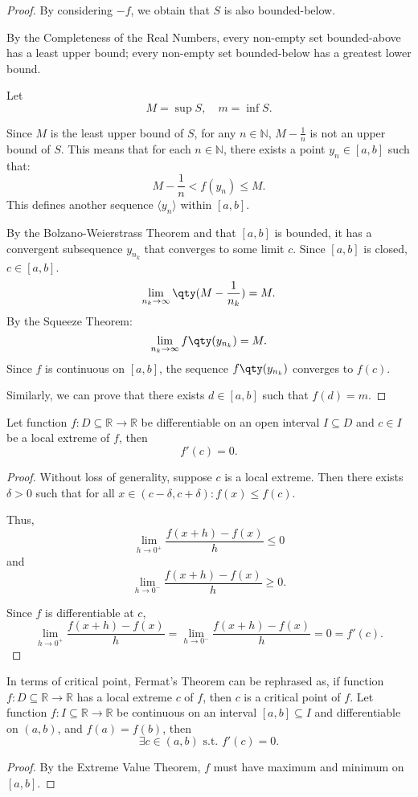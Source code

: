 \documentclass[a4paper,12pt]{report}
\begin{document}
\begin{itemize}
\begin{itemize}
\begin{proof}
By considering $-f$, we obtain that $S$ is also bounded-below.

By the Completeness of the Real Numbers, every non-empty set bounded-above has a least upper bound; every non-empty set bounded-below has a greatest lower bound.

Let
\[M=\sup S,\quad m=\inf S.\]

Since $M$ is the least upper bound of $S$, for any $n\in\mathbb{N}$, $M-\frac{1}{n}$ is not an upper bound of $S$. This means that for each $n\in\mathbb{N}$, there exists a point $y_n\in [a,b]$ such that:
\[M-\frac{1}{n}<f(y_n)\leq M.\]
This defines another sequence $\langle y_n\rangle$ within $[a, b]$.

By the Bolzano-Weierstrass Theorem and that $[a,b]$ is bounded, it has a convergent subsequence $y_{n_k}$ that converges to some limit $c$. Since $[a,b]$ is closed, $c\in [a,b]$.
\[\lim_{n_k\to \infty}\qty(M - \frac{1}{n_k}) = M.\]
By the Squeeze Theorem:
\[\lim_{n_k \to \infty} f\qty(y_{n_k}) = M.\]
Since $f$ is continuous on $[a,b]$, the sequence $f\qty(y_{n_k})$ converges to $f(c)$.

Similarly, we can prove that there exists $d\in [a,b]$ such that $f(d)=m$.
\end{proof}
Let function $f\colon D\subseteq\mathbb{R}\to\mathbb{R}$ be differentiable on an open interval $I\subseteq D$ and $c\in I$ be a local extreme of $f$, then
\[f'(c)=0.\]
\begin{proof}
Without loss of generality, suppose $c$ is a local extreme. Then there exists $\delta>0$ such that for all $x\in (c-\delta,c+\delta)\colon f(x)\leq f(c)$.

Thus,
\[\lim_{h\to 0^+}\frac{f(x+h)-f(x)}{h}\leq 0\]
and
\[\lim_{h\to 0^-}\frac{f(x+h)-f(x)}{h}\geq 0.\]

Since $f$ is differentiable at $c$,
\[\lim_{h\to 0^+}\frac{f(x+h)-f(x)}{h}=\lim_{h\to 0^-}\frac{f(x+h)-f(x)}{h}=0=f'(c).\]
\end{proof}
In terms of critical point, Fermat's Theorem can be rephrased as, if function $f\colon D\subseteq\mathbb{R}\to\mathbb{R}$ has a local extreme $c$ of $f$, then $c$ is a critical point of $f$.
Let function $f\colon I\subseteq\mathbb{R}\to\mathbb{R}$ be continuous on an interval $[a, b]\subseteq I$ and differentiable on $(a,b)$, and $f(a)=f(b)$, then
\[\exists c\in (a, b)\text{\ s.t.\ }f'(c)=0.\]
\begin{proof}
By the Extreme Value Theorem, $f$ must have maximum and minimum on $[a,b]$.


\end{proof}
\end{itemize}
\end{itemize}
\end{document}
